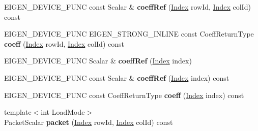 \begin{DoxyCompactItemize}
\item 
\mbox{\label{class_eigen_1_1internal_1_1_block_impl__dense_a8728f3d4165b1d602334a0a9c4ac74ae}} 
E\+I\+G\+E\+N\+\_\+\+D\+E\+V\+I\+C\+E\+\_\+\+F\+U\+NC const Scalar \& {\bfseries coeff\+Ref} (\hyperlink{namespace_eigen_a62e77e0933482dafde8fe197d9a2cfde}{Index} row\+Id, \hyperlink{namespace_eigen_a62e77e0933482dafde8fe197d9a2cfde}{Index} col\+Id) const
\item 
\mbox{\label{class_eigen_1_1internal_1_1_block_impl__dense_a6b865aa92f59769f560e1b67990d9199}} 
E\+I\+G\+E\+N\+\_\+\+D\+E\+V\+I\+C\+E\+\_\+\+F\+U\+NC E\+I\+G\+E\+N\+\_\+\+S\+T\+R\+O\+N\+G\+\_\+\+I\+N\+L\+I\+NE const Coeff\+Return\+Type {\bfseries coeff} (\hyperlink{namespace_eigen_a62e77e0933482dafde8fe197d9a2cfde}{Index} row\+Id, \hyperlink{namespace_eigen_a62e77e0933482dafde8fe197d9a2cfde}{Index} col\+Id) const
\item 
\mbox{\label{class_eigen_1_1internal_1_1_block_impl__dense_a9f7f0e5c43d9230cc2fcae8f0a996d59}} 
E\+I\+G\+E\+N\+\_\+\+D\+E\+V\+I\+C\+E\+\_\+\+F\+U\+NC Scalar \& {\bfseries coeff\+Ref} (\hyperlink{namespace_eigen_a62e77e0933482dafde8fe197d9a2cfde}{Index} index)
\item 
\mbox{\label{class_eigen_1_1internal_1_1_block_impl__dense_a08ec8723ba5b7b42418993b75efa6509}} 
E\+I\+G\+E\+N\+\_\+\+D\+E\+V\+I\+C\+E\+\_\+\+F\+U\+NC const Scalar \& {\bfseries coeff\+Ref} (\hyperlink{namespace_eigen_a62e77e0933482dafde8fe197d9a2cfde}{Index} index) const
\item 
\mbox{\label{class_eigen_1_1internal_1_1_block_impl__dense_a3acaeaa2adcc188cde276bf87043f317}} 
E\+I\+G\+E\+N\+\_\+\+D\+E\+V\+I\+C\+E\+\_\+\+F\+U\+NC const Coeff\+Return\+Type {\bfseries coeff} (\hyperlink{namespace_eigen_a62e77e0933482dafde8fe197d9a2cfde}{Index} index) const
\item 
\mbox{\label{class_eigen_1_1internal_1_1_block_impl__dense_a417d701309282c0781b83cbd052a0a3b}} 
{\footnotesize template$<$int Load\+Mode$>$ }\\Packet\+Scalar {\bfseries packet} (\hyperlink{namespace_eigen_a62e77e0933482dafde8fe197d9a2cfde}{Index} row\+Id, \hyperlink{namespace_eigen_a62e77e0933482dafde8fe197d9a2cfde}{Index} col\+Id) const

\end{DoxyCompactItemize}
